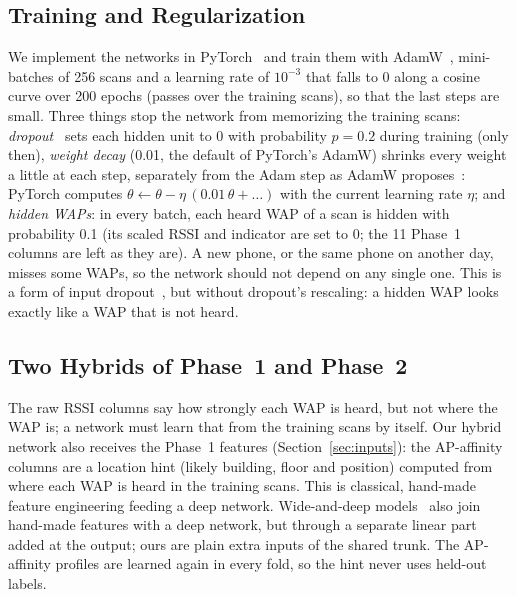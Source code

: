 \subsection{Training and Regularization}\label{sec:training}
We implement the networks in PyTorch~\cite{paszke2019pytorch} and train them
with AdamW~\cite{kingma2015adam,loshchilov2019decoupled}, mini-batches
of 256 scans and a learning rate of $10^{-3}$ that falls to 0 along a cosine
curve over 200 epochs (passes over the training scans), so that the last
steps are small. Three things stop the network from memorizing the
training scans: \emph{dropout}~\cite{srivastava2014dropout} sets each hidden
unit to 0 with probability $p=0.2$ during training (only then),
\emph{weight decay} (0.01, the default of PyTorch's AdamW) shrinks every
weight a little at each step, separately from the Adam step as AdamW
proposes~\cite{loshchilov2019decoupled}: PyTorch computes
$\theta\leftarrow\theta-\eta\,(0.01\,\theta+\ldots)$ with the current learning
rate $\eta$; and \emph{hidden WAPs}: in every batch, each heard WAP of a scan is
hidden with probability 0.1 (its scaled RSSI and indicator are set to 0; the 11
Phase~1 columns are left as they are). A new phone, or the same phone on another
day, misses some WAPs, so the network should not depend on any single one. This
is a form of input dropout~\cite{srivastava2014dropout}, but without dropout's
rescaling: a hidden WAP looks exactly like a WAP that is not heard.

\subsection{Two Hybrids of Phase~1 and Phase~2}\label{sec:hybrid}
The raw RSSI columns say how strongly each WAP is heard, but not where the WAP
is; a network must learn that from the training scans by itself. Our hybrid
network also receives the Phase~1 features (Section~\ref{sec:inputs}): the
AP-affinity columns are a location hint (likely building, floor and position)
computed from where each WAP is heard in the training scans. This is
classical, hand-made feature engineering feeding a deep network. Wide-and-deep
models~\cite{cheng2016wide} also join hand-made features with a deep network,
but through a separate linear part added at the output; ours are plain extra
inputs of the shared trunk. The AP-affinity profiles are
learned again in every fold, so the hint never uses held-out labels.

